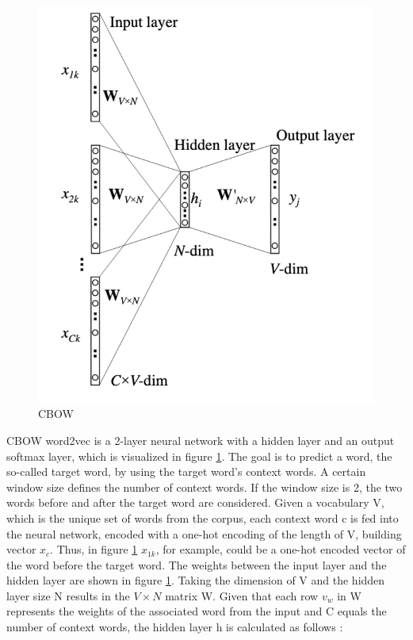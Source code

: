 \documentclass[12pt, a4paper, titlepage]{article}
\begin{document}
\begin{figure}[]
  \center
  \includegraphics[scale=0.5]{word2vecCBOW.png}
  \caption[CBOW]{\label{fig: F1} CBOW \citep[6]{rong2014}}
\end{figure}

\ac{CBOW} word2vec is a 2-layer neural network with a hidden layer and an output softmax layer, which is visualized in figure \ref{fig: F1}. The goal is to predict a word, the so-called target word, by using the target word's context words. A certain window size defines the number of context words. If the window size is 2, the two words before and after the target word are considered. Given a vocabulary V, which is the unique set of words from the corpus, each context word c is fed into the neural network, encoded with a one-hot encoding of the length of V, building vector $x_c$. Thus, in figure \ref*{fig: F1} $x_{1k}$, for example, could be a one-hot encoded vector of the word before the target word. The weights between the input layer and the hidden layer are shown in figure \ref{fig: F1}. Taking the dimension of V and the hidden layer size N results in the $V \times N$ matrix W. Given that each row $v_w$ in W represents the weights of the associated word from the input and C equals the number of context words, the hidden layer h is calculated as follows \citep{rong2014}:
\end{document}
